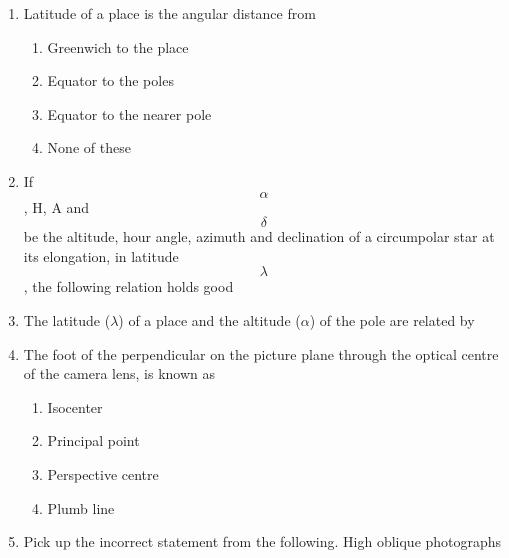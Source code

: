 \documentclass[11pt,a4paper]{article}
\begin{document}
\begin{enumerate}
\item{Latitude of a place is the angular distance from}
\begin{enumerate}[label=\Alph*.]
\item{Greenwich to the place}
\item{Equator to the poles}
\item{Equator to the nearer pole}
\item{None of these}
\end{enumerate}
\item{If $$\alpha $$, H, A and $$\delta $$ be the altitude, hour angle, azimuth and declination of a circumpolar star at its elongation, in latitude $$\lambda $$, the following relation holds good
}
\\
\item{The latitude ($\lambda$) of a place and the altitude ($\alpha$) of the pole are related by
}
\\
\item{The foot of the perpendicular on the picture plane through the optical centre of the camera lens, is known as}
\begin{enumerate}[label=\Alph*.]
\item{Isocenter}
\item{Principal point}
\item{Perspective centre}
\item{Plumb line}
\end{enumerate}
\item{Pick up the incorrect statement from the following. High oblique photographs}

\end{enumerate}
\end{document}
